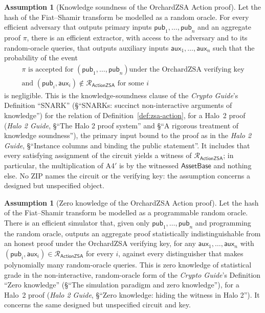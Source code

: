 \documentclass[11pt,a4paper]{article}
\theoremstyle{definition}
\newtheorem{assumption}[theorem]{Assumption}
\newcommand{\Rel}{\mathcal{R}}
\begin{document}
\begin{assumption}[Knowledge soundness of the OrchardZSA Action proof]
\label{ass:zsa-ks}
Let the hash of the Fiat--Shamir transform be modelled as a random oracle.
For every efficient adversary that outputs primary inputs
$\mathsf{pub}_1, \dots, \mathsf{pub}_n$ and an aggregate proof $\pi$, there
is an efficient extractor, with access to the adversary and to its
random-oracle queries, that outputs auxiliary inputs
$\mathsf{aux}_1, \dots, \mathsf{aux}_n$ such that the probability of the
event
\begin{gather*}
  \text{$\pi$ is accepted for $(\mathsf{pub}_1, \dots, \mathsf{pub}_n)$
    under the OrchardZSA verifying key} \\
  \text{and } (\mathsf{pub}_i, \mathsf{aux}_i) \notin
    \Rel_{\mathsf{ActionZSA}} \text{ for some } i
\end{gather*}
is negligible. This is the knowledge-soundness clause of the \emph{Crypto
Guide}'s Definition ``SNARK'' (\S``SNARKs: succinct non-interactive
arguments of knowledge'') for the relation of
Definition~\ref{def:zsa-action}, for a Halo~2 proof (\emph{Halo 2 Guide},
\S``The Halo 2 proof system'' and \S``A rigorous treatment of knowledge
soundness''), the primary input bound to the proof as in the \emph{Halo 2
Guide}, \S``Instance columns and binding the public statement''. It
includes that every satisfying assignment of the circuit yields a witness
of $\Rel_{\mathsf{ActionZSA}}$; in particular, the multiplication of A4$'$
is by the witnessed $\mathsf{AssetBase}$ and nothing else. No ZIP names the
circuit or the verifying key: the assumption concerns a designed but
unspecified object.
\end{assumption}

\begin{assumption}[Zero knowledge of the OrchardZSA Action proof]
\label{ass:zsa-zk}
Let the hash of the Fiat--Shamir transform be modelled as a programmable
random oracle. There is an efficient simulator that, given only
$\mathsf{pub}_1, \dots, \mathsf{pub}_n$ and programming the random oracle,
outputs an aggregate proof statistically indistinguishable from an honest
proof under the OrchardZSA verifying key, for any
$\mathsf{aux}_1, \dots, \mathsf{aux}_n$ with
$(\mathsf{pub}_i, \mathsf{aux}_i) \in \Rel_{\mathsf{ActionZSA}}$ for every
$i$, against every distinguisher that makes polynomially many random-oracle
queries. This is zero knowledge of statistical grade in the
non-interactive, random-oracle form of the \emph{Crypto Guide}'s Definition
``Zero knowledge'' (\S``The simulation paradigm and zero knowledge''), for
a Halo~2 proof (\emph{Halo 2 Guide}, \S``Zero knowledge: hiding the witness
in Halo 2''). It concerns the same designed but unspecified circuit and
key.
\end{assumption}
\end{document}

